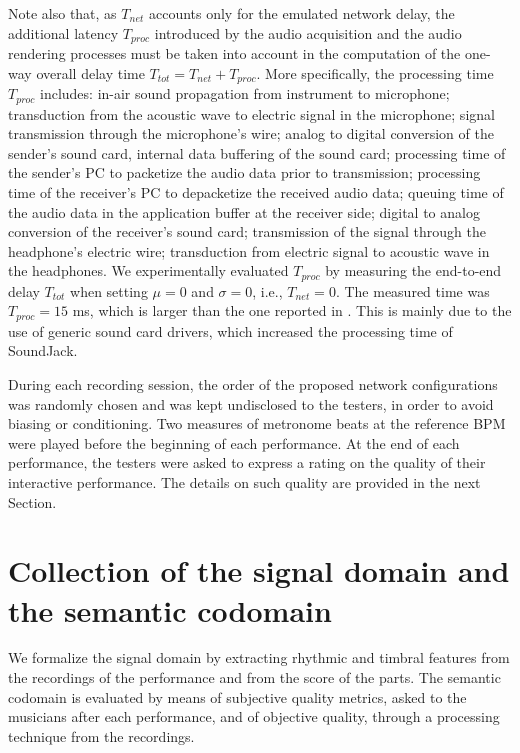 Note also that, as $T_{net}$ accounts only for the emulated network delay, the additional latency $T_{proc}$ introduced by the audio acquisition and the audio rendering processes must be taken into account in the computation of the one-way overall delay time $T_{tot}=T_{net}+ T_{proc}$.
More specifically, the processing time $T_{proc}$ includes: in-air sound propagation from instrument to microphone; transduction from the acoustic wave to electric signal in the microphone; signal transmission through the microphone's wire; analog to digital conversion of the sender's sound card, internal data buffering of the sound card; processing time of the sender's PC to packetize the audio data prior to transmission; processing time of the receiver's PC to depacketize the received audio data; queuing time of the audio data in the application buffer at the receiver side; digital to analog conversion of the receiver's sound card; transmission of the signal through the headphone's electric wire; transduction from electric signal to acoustic wave in the headphones.
We experimentally evaluated $T_{proc}$ by measuring the end-to-end delay $T_{tot}$ when setting $\mu=0$ and $\sigma=0$, i.e., $T_{net}=0$. The measured time was $T_{proc}=15$ ms, which is larger than the one reported in \cite{carot2007networked}. This is mainly due to the use of generic sound card drivers, which increased the processing time of SoundJack.

During each recording session, the order of the proposed network configurations was randomly chosen and was kept undisclosed to the testers, in order to avoid biasing or conditioning. Two measures of metronome beats at the reference BPM were played before the beginning of each performance. At the end of each performance, the testers were asked to express a rating on the quality of their interactive performance. The details on such quality are provided in the next Section.

\section{Collection of the signal domain and the semantic codomain}\label{sec:NMP:domain}
We formalize the signal domain by extracting rhythmic and timbral features from the recordings of the performance and from the score of the parts. The semantic codomain is evaluated by means of subjective quality metrics, asked to the musicians after each performance, and of objective quality, through a processing technique from the recordings.


